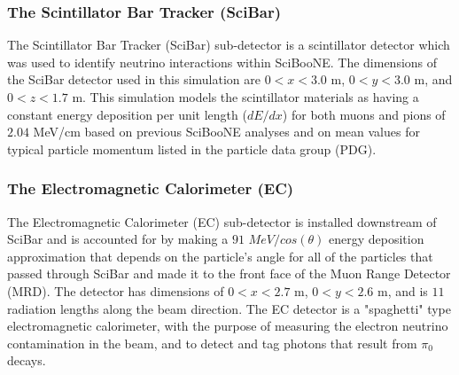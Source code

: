 \documentclass[11pt]{article}
\begin{document}
\subsubsection{The Scintillator Bar Tracker (SciBar)}
\label{subsub:SciBar}
The Scintillator Bar Tracker (SciBar) sub-detector is a scintillator detector which was used to identify neutrino interactions within SciBooNE. The dimensions of the SciBar detector used in this simulation are $0 < x < 3.0$ m, $0 < y < 3.0$ m, and $0 < z < 1.7$ m. This simulation models the scintillator materials as having a constant energy deposition per unit length ($dE/dx$) for both muons and pions of $2.04$ MeV/cm based on previous SciBooNE analyses and on mean values for typical particle momentum listed in the particle data group (PDG).

\subsubsection{The Electromagnetic Calorimeter (EC)}
\label{subsub:EC}
The Electromagnetic Calorimeter (EC) sub-detector is installed downstream of SciBar and is accounted for by making a $91$ $MeV/cos(\theta)$ energy deposition approximation that depends on the particle's angle for all of the particles that passed through SciBar and made it to the front face of the Muon Range Detector (MRD). The detector has dimensions of $0 < x < 2.7$ m, $0 < y < 2.6$ m, and is $11$ radiation lengths along the beam direction. The EC detector is a "spaghetti" type electromagnetic calorimeter, with the purpose of measuring the electron neutrino contamination in the beam, and to detect and tag photons that result from $\pi_{0}$ decays.

\end{document}

